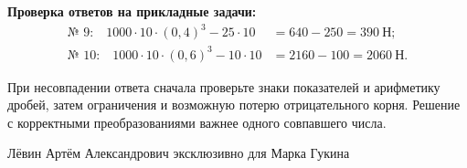 \documentclass[a4paper,12pt]{article}
\begin{document}
\vspace{10mm}
\textbf{Проверка ответов на прикладные задачи:}
\begin{align*}
\text{№ 9:}\quad 1000\cdot10\cdot(0{,}4)^3-25\cdot10
&=640-250=390\ \text{Н};\\
\text{№ 10:}\quad 1000\cdot10\cdot(0{,}6)^3-10\cdot10
&=2160-100=2060\ \text{Н}.
\end{align*}

При несовпадении ответа сначала проверьте знаки показателей и арифметику дробей, затем ограничения и возможную потерю отрицательного корня. Решение с корректными преобразованиями важнее одного совпавшего числа.

\vfill
\begin{center}{\color{muted}\small Лёвин Артём Александрович эксклюзивно для Марка Гукина}\end{center}
\end{document}

